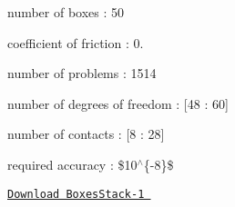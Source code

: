


\begin{DoxyItemize}
\item number of boxes \+: 50  
\item coefficient of friction \+: 0.  
\item number of problems \+: 1514  
\item number of degrees of freedom \+: \mbox{[}48 \+: 60\mbox{]}  
\item number of contacts \+: \mbox{[}8 \+: 28\mbox{]}  
\item required accuracy \+: \$10$^\wedge$\{-\/8\}\$ 


\end{DoxyItemize}

\href{./resources/BoxesStack-1.tar.gz}{\tt Download Boxes\+Stack-\/1 } 